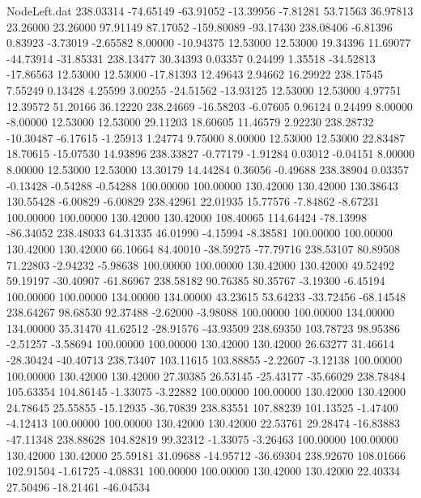 \begin{filecontents}{NodeLeft.dat}
 238.03314  -74.65149  -63.91052   -13.39956   -7.81281   53.71563   36.97813   23.26000   23.26000   97.91149   87.17052 -159.80089  -93.17430
 238.08406   -6.81396    0.83923    -3.73019   -2.65582    8.00000  -10.94375   12.53000   12.53000   19.34396   11.69077  -44.73914  -31.85331
 238.13477   30.34393    0.03357     0.24499    1.35518  -34.52813  -17.86563   12.53000   12.53000  -17.81393   12.49643    2.94662   16.29922
 238.17545    7.55249    0.13428     4.25599    3.00255  -24.51562  -13.93125   12.53000   12.53000    4.97751   12.39572   51.20166   36.12220
 238.24669  -16.58203   -6.07605     0.96124    0.24499    8.00000   -8.00000   12.53000   12.53000   29.11203   18.60605   11.46579    2.92230
 238.28732  -10.30487   -6.17615    -1.25913    1.24774    9.75000    8.00000   12.53000   12.53000   22.83487   18.70615  -15.07530   14.93896
 238.33827   -0.77179   -1.91284     0.03012   -0.04151    8.00000    8.00000   12.53000   12.53000   13.30179   14.44284    0.36056   -0.49688
 238.38904    0.03357   -0.13428    -0.54288   -0.54288  100.00000  100.00000  130.42000  130.42000  130.38643  130.55428   -6.00829   -6.00829
 238.42961   22.01935   15.77576    -7.84862   -8.67231  100.00000  100.00000  130.42000  130.42000  108.40065  114.64424  -78.13998  -86.34052
 238.48033   64.31335   46.01990    -4.15994   -8.38581  100.00000  100.00000  130.42000  130.42000   66.10664   84.40010  -38.59275  -77.79716
 238.53107   80.89508   71.22803    -2.94232   -5.98638  100.00000  100.00000  130.42000  130.42000   49.52492   59.19197  -30.40907  -61.86967
 238.58182   90.76385   80.35767    -3.19300   -6.45194  100.00000  100.00000  134.00000  134.00000   43.23615   53.64233  -33.72456  -68.14548
 238.64267   98.68530   92.37488    -2.62000   -3.98088  100.00000  100.00000  134.00000  134.00000   35.31470   41.62512  -28.91576  -43.93509
 238.69350  103.78723   98.95386    -2.51257   -3.58694  100.00000  100.00000  130.42000  130.42000   26.63277   31.46614  -28.30424  -40.40713
 238.73407  103.11615  103.88855    -2.22607   -3.12138  100.00000  100.00000  130.42000  130.42000   27.30385   26.53145  -25.43177  -35.66029
 238.78484  105.63354  104.86145    -1.33075   -3.22882  100.00000  100.00000  130.42000  130.42000   24.78645   25.55855  -15.12935  -36.70839
 238.83551  107.88239  101.13525    -1.47400   -4.12413  100.00000  100.00000  130.42000  130.42000   22.53761   29.28474  -16.83883  -47.11348
 238.88628  104.82819   99.32312    -1.33075   -3.26463  100.00000  100.00000  130.42000  130.42000   25.59181   31.09688  -14.95712  -36.69304
 238.92670  108.01666  102.91504    -1.61725   -4.08831  100.00000  100.00000  130.42000  130.42000   22.40334   27.50496  -18.21461  -46.04534

\end{filecontents}
